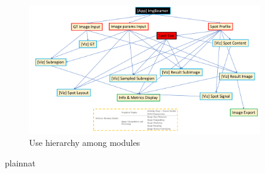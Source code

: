 \documentclass[12pt, titlepage]{article}
\begin{document}
\begin{figure}[H]
\centering
\includegraphics[width=0.9\textwidth]{MG_graph_draft.pdf}
\caption{Use hierarchy among modules}
\label{FigUH}
\end{figure}


 {plainnat}


\newpage{}
\end{document}

